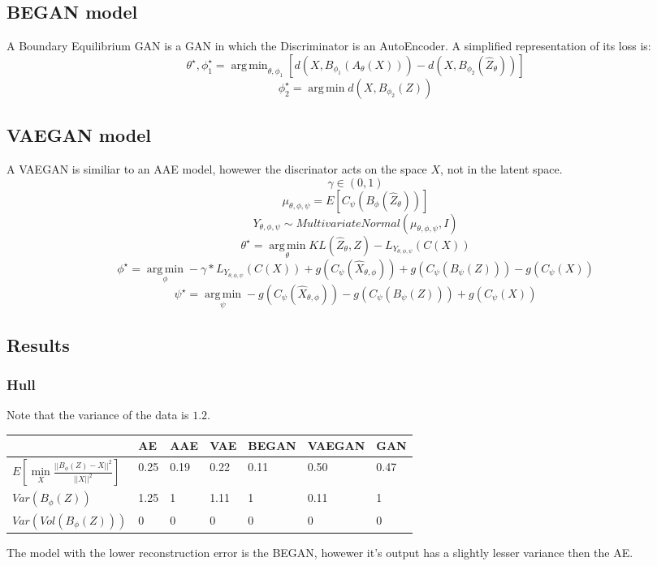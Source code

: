 \documentclass{article}
\DeclareMathOperator*{\argmin}{arg\,min}
\begin{document}
\subsection{BEGAN model}
A Boundary Equilibrium GAN \cite{began} is a GAN in which the Discriminator is an AutoEncoder. A simplified representation of its loss is:
$$\theta^{\star},\phi_{1}^{\star}=\argmin_{\theta,\phi_{1}}[ d(X,B_{\phi_{1}}(A_{\theta}(X)))-d(X,B_{\phi_{2}}(\hat{Z}_{\theta}))]$$
$$\phi_{2}^{\star}=\argmin d(X,B_{\phi_{2}}(Z))$$
\subsection{VAEGAN model}
A VAEGAN \cite{vaegan} is similiar to an AAE model, howewer the discrinator acts on the space $X$, not in the latent space.
$$\gamma \in (0,1)$$
$$\mu_{\theta,\phi,\psi}=E[C_{\psi}(B_{\phi}(\hat{Z}_{\theta}))]$$
$$Y_{\theta,\phi,\psi}\sim MultivariateNormal(\mu_{\theta,\phi,\psi},I)$$
$$\theta^{\star}=\argmin\limits_{\theta} KL(\hat{Z}_{\theta},Z)-L_{Y_{\theta,\phi,\psi}}(C(X))$$
$$\phi^{\star}= \argmin\limits_{\phi} -\gamma*L_{Y_{\theta,\phi,\psi}}(C(X))+g(C_{\psi}(\hat{X}_{\theta,\phi}))+g(C_{\psi}(B_{\psi}(Z)))-g(C_{\psi}(X))$$
$$\psi^{\star}=\argmin\limits_{\psi}- g(C_{\psi}(\hat{X}_{\theta,\phi}))-g(C_{\psi}(B_{\psi}(Z)))+g(C_{\psi}(X))$$

\subsection{Results}
\subsubsection{Hull}
Note that the variance of the data is $1.2$.
\begin{table}[H]
\begin{tabular}{|l|l|l|l|l|l|l|}
\hline
                                             & AE & AAE & VAE & BEGAN & VAEGAN & GAN \\ \hline
$E[\min\limits_{X} \frac{||B_{\phi}(Z)-X||^{2}}{||X||^{2}}]$& 0.25  & 0.19 & 0.22 & 0.11	 & 0.50 & 0.47 \\ \hline
$Var(B_{\phi}(Z))$	& 1.25 & 1 & 1.11 & 1 & 0.11 & 1 \\ \hline
$Var(Vol(B_{\phi}(Z)))$	& 0 & 0  & 0 & 0 & 0 & 0  \\ \hline

\end{tabular}
\end{table}
The model with the lower reconstruction error is the BEGAN, howewer it's output has a slightly lesser variance then the AE.
\end{document}

